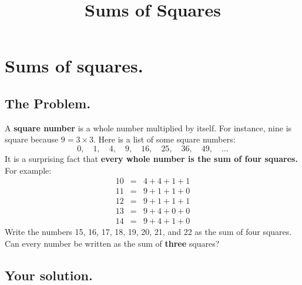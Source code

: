 \documentclass[12pt]{article}
\title{Sums of Squares}
\begin{document}
\section*{Sums of squares.}

\subsection*{The Problem.}

A \textbf{square number} is a whole number multiplied by itself.  For
instance, nine is square because $9 = 3 \times 3$.  Here is a list of
some square numbers:
$$
0,\hspace{1em} 1,\hspace{1em} 4 ,\hspace{1em}9,\hspace{1em} 16,\hspace{1em} 25,\hspace{1em} 36,\hspace{1em} 49,\hspace{1em} \ldots
$$
It is a surprising fact that \textbf{every whole number is the sum of
  four squares.}  For example:
\begin{eqnarray*}
10 &=& 4 + 4 + 1 + 1 \\
11 &=& 9 + 1 + 1 + 0 \\
12 &=& 9 + 1 + 1 + 1 \\
13 &=& 9 + 4 + 0 + 0 \\
14 &=& 9 + 4 + 1 + 0
\end{eqnarray*}
Write the numbers 15, 16, 17, 18, 19, 20, 21, and 22 as the sum of
four squares.  Can every number be written as the sum of \textbf{three}
squares?

\subsection*{Your solution.}
\end{document}
